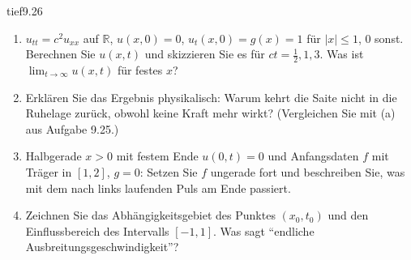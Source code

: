 \begin{karte}{tief}{9.26}{\typtypisch}{}
\begin{enumerate}[label=(\alph*),leftmargin=1.6em,itemsep=2pt]
\item $u_{tt} = c^{2}u_{xx}$ auf $\mathbb R$, $u(x, 0) = 0$, $u_t(x, 0) = g(x) = 1$ für $|x|\le1$, $0$ sonst. Berechnen Sie $u(x, t)$ und skizzieren Sie es für $ct = \frac12, 1, 3$. Was ist $\lim_{t\to\infty}u(x, t)$ für festes $x$?
\item Erklären Sie das Ergebnis physikalisch: Warum kehrt die Saite nicht in die Ruhelage zurück, obwohl keine Kraft mehr wirkt? (Vergleichen Sie mit (a) aus Aufgabe 9.25.)
\item Halbgerade $x > 0$ mit festem Ende $u(0, t) = 0$ und Anfangsdaten $f$ mit Träger in $[1, 2]$, $g = 0$: Setzen Sie $f$ ungerade fort und beschreiben Sie, was mit dem nach links laufenden Puls am Ende passiert.
\item Zeichnen Sie das Abhängigkeitsgebiet des Punktes $(x_0, t_0)$ und den Einflussbereich des Intervalls $[-1, 1]$. Was sagt \enquote{endliche Ausbreitungsgeschwindigkeit}?
\end{enumerate}
\end{karte}

